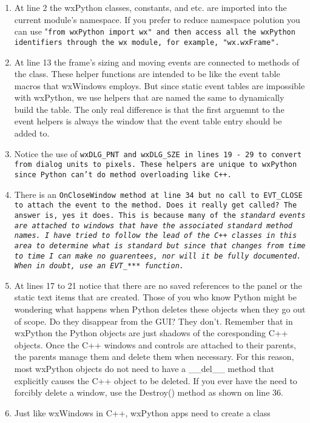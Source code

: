 \begin{enumerate}\itemsep=0pt
\item At line 2 the wxPython classes, constants, and etc. are imported
into the current module's namespace.  If you prefer to reduce
namespace polution you can use "\tt{from wxPython import wx}" and
then access all the wxPython identifiers through the wx module, for
example, "\tt{wx.wxFrame}".
\item At line 13 the frame's sizing and moving events are connected to
methods of the class.  These helper functions are intended to be like
the event table macros that wxWindows employs.  But since static event
tables are impossible with wxPython, we use helpers that are named the
same to dynamically build the table.  The only real difference is
that the first arguemnt to the event helpers is always the window that
the event table entry should be added to.
\item Notice the use of \tt{wxDLG\_PNT} and \tt{wxDLG\_SZE} in lines 19
- 29 to convert from dialog units to pixels.  These helpers are unique
to wxPython since Python can't do method overloading like C++.
\item There is an \tt{OnCloseWindow} method at line 34 but no call to
EVT\_CLOSE to attach the event to the method.  Does it really get
called?  The answer is, yes it does.  This is because many of the 
\em{standard} events are attached to windows that have the associated
\em{standard} method names.  I have tried to follow the lead of the
C++ classes in this area to determine what is \em{standard} but since
that changes from time to time I can make no guarentees, nor will it
be fully documented.  When in doubt, use an EVT\_*** function.
\item At lines 17 to 21 notice that there are no saved references to
the panel or the static text items that are created.  Those of you
who know Python might be wondering what happens when Python deletes
these objects when they go out of scope.  Do they disappear from the GUI?  They
don't.  Remember that in wxPython the Python objects are just shadows of the
coresponding C++ objects.  Once the C++ windows and controls are
attached to their parents, the parents manage them and delete them
when necessary.  For this reason, most wxPython objects do not need to
have a \_\_del\_\_ method that explicitly causes the C++ object to be
deleted.  If you ever have the need to forcibly delete a window, use
the Destroy() method as shown on line 36.
\item Just like wxWindows in C++, wxPython apps need to create a class

\end{enumerate}
